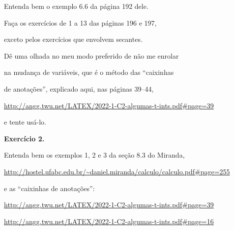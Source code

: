 \documentclass[oneside,12pt]{article}
\begin{document}
\ssk

Entenda bem o exemplo 6.6 da página 192 dele.

Faça os exercícios de 1 a 13 das páginas 196 e 197,

exceto pelos exercícios que envolvem secantes.

\msk

Dê uma olhada no meu modo preferido de não me enrolar

na mudança de variáveis, que é o método das ``caixinhas

de anotações'', explicado aqui, nas páginas 39--44,

\ssk

{\scriptsize

\url{http://angg.twu.net/LATEX/2022-1-C2-algumas-t-ints.pdf\#page=39}

}

\ssk

e tente usá-lo.


\newpage


{\bf Exercício 2.}

Entenda bem os exemplos 1, 2 e 3 da seção 8.3 do Miranda,

\ssk

{\scriptsize

\url{http://hostel.ufabc.edu.br/~daniel.miranda/calculo/calculo.pdf\#page=255}

}

\ssk

e as ``caixinhas de anotações'':

\ssk

{\footnotesize

\url{http://angg.twu.net/LATEX/2022-1-C2-algumas-t-ints.pdf\#page=39}

\url{http://angg.twu.net/LATEX/2022-1-C2-algumas-t-ints.pdf\#page=16}

}
\end{document}
